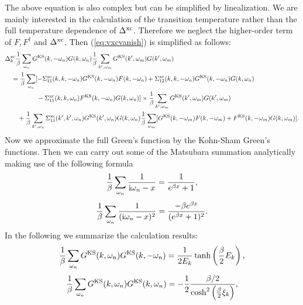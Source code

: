 %
The above equation is also complex but can be simplified by linealization.
We are mainly interested in the calculation of the transition temperature rather than the full temperature 
dependence of $\Delta^{\rm xc}$. Therefore we neglect the higher-order term of $F, F^{\dag}$ and $\Delta^{\rm xc}$.
Then (\ref{eq:vxcvanish}) is simplified as follows:
%
\begin{equation}
	\begin{split}
		&\Delta^{\rm xc}_{k}\frac{1}{\beta}\sum_{\omega_n}G^{\rm KS}(k,-\omega_n)G(k,\omega_n)
		\frac{1}{\beta}\sum_{k',\omega_m}G^{\rm KS}(k',\omega_m)G(k',\omega_m) \\
		& \quad =
		\frac{1}{\beta}\sum_{\omega_n} [-\Sigma^{\rm xc}_{11}(k,k,-\omega_n)G^{\rm KS}(k,-\omega_n)F(k,-\omega_n)
		+\Sigma^{\rm xc}_{12}(k,k,-\omega_n)G^{\rm KS}(k,-\omega_n)G(k,\omega_n) \\
		&\quad \quad \quad \quad \quad - \Sigma^{\rm xc}_{11}(k,k,\omega_n)F^{\rm KS}(k,-\omega_n)G(k,\omega_n)]
		\times \frac{1}{\beta}\sum_{k',\omega_m} G^{\rm KS}(k',\omega_m)G(k', \omega_m) \\
		& \quad \quad +
		\frac{1}{\beta}\sum_{k',\omega_n}\Sigma^{\rm xc}_{11}(k',k',\omega_n)G^{\rm KS}(k',\omega_n)
		G(k,\omega_n)\frac{1}{\beta}\sum_{\omega_m}
		[G^{\rm KS}(k,-\omega_m)F(k,-\omega_m) + F^{\rm KS}(k,-\omega_m)G(k,\omega_m)].
	\end{split}
	\label{eq:Deltaxceq}
\end{equation}
%
Now we approximate the full Green's function by the Kohn-Sham Green's functions.
Then we can carry out some of the Matsubara summation analytically making use of the following formula
%
\begin{equation}
	\frac{1}{\beta} \sum_{\omega_n} \frac{1}{ {\rm i}\omega_n - x} = 
	\frac{1}{e^{\beta x}+1},
	\label{eq:sumform1}
\end{equation}
%
\begin{equation}
	\frac{1}{\beta} \sum_{\omega_n} \frac{1}{ ({\rm i}\omega_n - x)^2} = 
	\frac{-\beta e^{\beta x}}{(e^{\beta x}+1)^2}.
	\label{eq:sumform2}
\end{equation}
%
In the following we summarize the calculation results: 
%
\begin{equation}
	\frac{1}{\beta}\sum_{\omega_n}
	G^{\rm KS}(k,\omega_n)G^{\rm KS}(k,-\omega_n) 
	= \frac{1}{2E_{k}}\tanh\left( \frac{\beta}{2}E_{k} \right),
	\label{eq:GGsum1}
\end{equation}
%
\begin{equation}
	\frac{1}{\beta}\sum_{\omega_n}
	G^{\rm KS}(k,\omega_n)G^{\rm KS}(k,\omega_n) 
	= - \frac{1}{2} \frac{\beta/2}{\cosh^2\left( \frac{\beta}{2}\xi_{k} \right)},
	\label{eq:GGsum2}
\end{equation}
